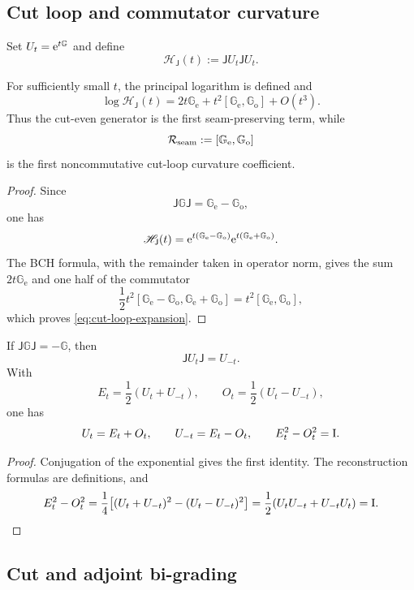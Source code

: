 \subsection{Cut loop and commutator curvature}

Set $U_t=\mathrm e^{t\mathbb G}$ and define
\[
\mathscr H_{\mathsf J}(t)
:=\mathsf J U_t\mathsf J U_t.
\]

\begin{theorem}
For sufficiently small $t$, the principal logarithm is defined and
\begin{equation}
\log\mathscr H_{\mathsf J}(t)
=2t\mathbb G_{\mathrm e}
+t^2[\mathbb G_{\mathrm e},\mathbb G_{\mathrm o}]
+O(t^3).
\label{eq:cut-loop-expansion}
\end{equation}
Thus the cut-even generator is the first seam-preserving term, while
\[
\mathcal R_{\mathrm{seam}}
:=[\mathbb G_{\mathrm e},\mathbb G_{\mathrm o}]
\]
is the first noncommutative cut-loop curvature coefficient.
\end{theorem}

\begin{proof}
Since
\[
\mathsf J\mathbb G\mathsf J
=\mathbb G_{\mathrm e}-\mathbb G_{\mathrm o},
\]
one has
\[
\mathscr H_{\mathsf J}(t)
=\mathrm e^{t(\mathbb G_{\mathrm e}-\mathbb G_{\mathrm o})}
 \mathrm e^{t(\mathbb G_{\mathrm e}+\mathbb G_{\mathrm o})}.
\]
The BCH formula, with the remainder taken in operator norm, gives the sum $2t\mathbb G_{\mathrm e}$ and one half of the commutator
\[
\frac12 t^2
[\mathbb G_{\mathrm e}-\mathbb G_{\mathrm o},
 \mathbb G_{\mathrm e}+\mathbb G_{\mathrm o}]
=t^2[\mathbb G_{\mathrm e},\mathbb G_{\mathrm o}],
\]
which proves \eqref{eq:cut-loop-expansion}.
\end{proof}

\begin{corollary}
If $\mathsf J\mathbb G\mathsf J=-\mathbb G$, then
\[
\mathsf J U_t\mathsf J=U_{-t}.
\]
With
\[
E_t=\frac12(U_t+U_{-t}),
\qquad
O_t=\frac12(U_t-U_{-t}),
\]
one has
\[
U_t=E_t+O_t,
\qquad
U_{-t}=E_t-O_t,
\qquad
E_t^2-O_t^2=\mathrm I.
\]
\end{corollary}

\begin{proof}
Conjugation of the exponential gives the first identity.  The reconstruction formulas are definitions, and
\[
E_t^2-O_t^2
=\frac14\bigl[(U_t+U_{-t})^2-(U_t-U_{-t})^2\bigr]
=\frac12(U_tU_{-t}+U_{-t}U_t)=\mathrm I.
\]
\end{proof}

\subsection{Cut and adjoint bi-grading}

